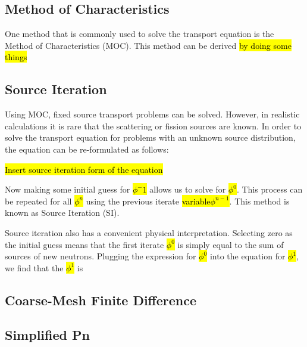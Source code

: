 \subsection{Method of Characteristics}

One method that is commonly used to solve the transport equation is the Method of Characteristics (MOC).  This method can be derived \hl{by doing some things}

\subsection{Source Iteration}

Using MOC, fixed source transport problems can be solved.  However, in realistic calculations it is rare that the scattering or fission sources are known.  In order to solve the transport equation for problems with an unknown source distribution, the equation can be re-formulated as follows:

\hl{Insert source iteration form of the equation}

Now making some initial guess for \hl{$\phi^-1$} allows us to solve for \hl{$\phi^0$}.  This process can be repeated for all \hl{$\phi^n$} using the previous iterate \hl{variable$\phi^{n-1}$}.  This method is known as Source Iteration (SI).

Source iteration also has a convenient physical interpretation.  Selecting zero as the initial guess means that the first iterate \hl{$\phi^0$} is simply equal to the sum of sources of new neutrons.  Plugging the expression for \hl{$\phi^0$} into the equation for \hl{$\phi^1$}, we find that the \hl{$\phi^1$} is 

\subsection{Coarse-Mesh Finite Difference}



\subsection{Simplified Pn}